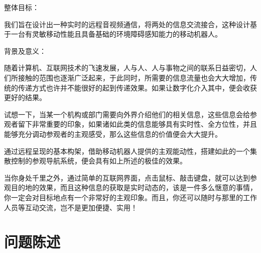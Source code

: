 

整体目标：

我们旨在设计出一种实时的远程音视频通信，将两处的信息交流接合，这种设计基于一台有灵敏移动性能且具备基础的环境障碍感知能力的移动机器人。

背景及意义：

随着计算机、互联网技术的飞速发展，人与人、人与事物之间的联系日益密切，人们所接触的范围也逐渐广泛起来，于此同时，所需要的信息流量也会大大增加，传统的传递方式也许并不能很好的起到传递效果。如果让数字化介入其中，便会收获更好的结果。

试想一下，当某一个机构或部门需要向外界介绍他们的相关信息，这些信息会给参观者留下非常重要的印象，如果诸如此类的信息能够具有实时性、全方位性，并且能够充分调动参观者的主观感受，那么这些信息的价值便会大大提升。

通过远程呈现的基本构架，借助移动机器人提供的主观能动性，搭建如此的一个集散控制的参观导航系统，便会具有如上所述的极佳的效果。

当你身处千里之外，通过简单的互联网界面，点击鼠标、敲击键盘，就可以达到参观目的地的效果，而且这种信息的获取是实时动态的，该是一件多么惬意的事情，你一定会对目标地点有一个非常好的主观印象。而且，你还可以随时与那里的工作人员等互动交流，岂不是更加便捷、实用！



\section{问题陈述}
\label{sec:problem}

